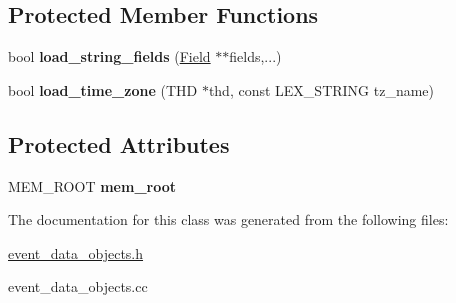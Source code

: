 \subsection*{Protected Member Functions}
\begin{DoxyCompactItemize}
\item 
bool {\bfseries load\+\_\+string\+\_\+fields} (\mbox{\hyperlink{classField}{Field}} $\ast$$\ast$fields,...)
\item 
bool {\bfseries load\+\_\+time\+\_\+zone} (T\+HD $\ast$thd, const L\+E\+X\+\_\+\+S\+T\+R\+I\+NG tz\+\_\+name)
\end{DoxyCompactItemize}
\subsection*{Protected Attributes}
\begin{DoxyCompactItemize}
\item 
\mbox{\label{classEvent__basic_ad060bf40cf7d84c3224b8286b624a8f0}} 
M\+E\+M\+\_\+\+R\+O\+OT {\bfseries mem\+\_\+root}
\end{DoxyCompactItemize}


The documentation for this class was generated from the following files\+:\begin{DoxyCompactItemize}
\item 
\mbox{\hyperlink{event__data__objects_8h}{event\+\_\+data\+\_\+objects.\+h}}\item 
event\+\_\+data\+\_\+objects.\+cc\end{DoxyCompactItemize}
